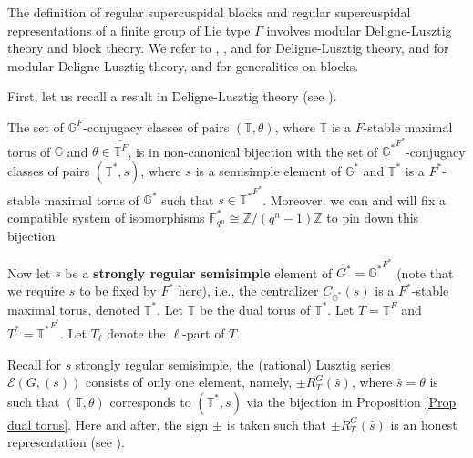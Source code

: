 		The definition of regular supercuspidal blocks and regular supercuspidal representations of a finite group of Lie type $\Gamma$ involves modular Deligne-Lusztig theory and block theory. We refer to \cite{deligne1976representations}, \cite{carter1985finite}, and \cite{digne2020representations} for Deligne-Lusztig theory, \cite{michel1989bloc} and \cite{broue1990isometries} for modular Deligne-Lusztig theory, and \cite[Appendix B]{bonnafe2010representations} for generalities on blocks. 
		
		First, let us recall a result in Deligne-Lusztig theory (see \cite[Proposition 11.1.5]{digne2020representations}). 
		
		\begin{proposition}\label{Prop dual torus}
			The set of $\mathbb{G}^F$-conjugacy classes of pairs $(\mathbb{T}, \theta)$, where  $\mathbb{T}$ is a $F$-stable maximal torus of  $\mathbb{G}$ and $\theta \in \widehat{\mathbb{T}^F}$, is in non-canonical bijection with the set of $\mathbb{G^*}^{F^*}$-conjugacy classes of pairs $(\mathbb{T}^*, s)$, where $s$ is a semisimple element of $\mathbb{G}^*$ and $\mathbb{T}^*$ is a $F^*$-stable maximal torus of $\mathbb{G}^*$ such that $s \in {\mathbb{T}^*}^{F^*}$.  Moreover, we can and will fix a compatible system of isomorphisms $\mathbb{F}_{q^n}^* \cong \mathbb{Z}/(q^n-1)\mathbb{Z}$ to pin down this bijection.
		\end{proposition}
		
		Now let $s$ be a \textbf{strongly regular semisimple} 
		element of $G^*={\mathbb{G}^*}^{F^*}$ (note that we require $s$ to be fixed by $F^*$ here), i.e., the centralizer $C_{\mathbb{G}^*}(s)$ is a $F^*$-stable maximal torus, denoted $\mathbb{T}^*$. Let $\mathbb{T}$ be the dual torus of $\mathbb{T}^*$. Let $T=\mathbb{T}^F$ and $T^*={\mathbb{T}^*}^{F^*}$. Let $T_\ell$ denote the $\ell$-part of $T$.
		
		Recall for $s$ strongly regular semisimple, the (rational) Lusztig series $\mathcal{E}(G, (s))$ consists of only one element, namely, $\pm R_T^G(\hat{s})$, where $\hat{s}=\theta$ is such that $(\mathbb{T}, \theta)$ corresponds to $(\mathbb{T}^*, s)$ via the bijection in Proposition \ref{Prop dual torus}. Here and after, the sign $\pm$ is taken such that $\pm R_T^G(\hat{s})$ is an honest representation (see \cite[Section 7.5]{carter1985finite}).
		
